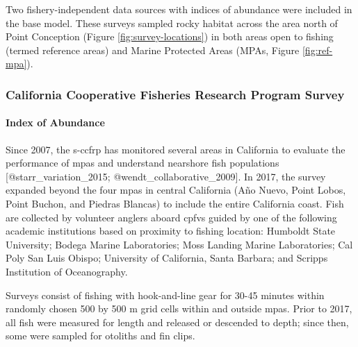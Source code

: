 \documentclass[11pt,
  letterpaper,
]{article}
\begin{document}
Two fishery-independent data sources with indices of abundance were included in the base model. These surveys sampled rocky habitat across the area north of Point Conception (Figure \ref{fig:survey-locations}) in both areas open to fishing (termed reference areas) and Marine Protected Areas (MPAs, Figure \ref{fig:ref-mpa}).

\subsubsection{California Cooperative Fisheries Research Program Survey}\label{california-cooperative-fisheries-research-program-survey}

\paragraph{Index of Abundance}\label{index-of-abundance}

\hfill\break

Since 2007, the \gls{s-ccfrp} has monitored several areas in California to evaluate the performance of \glspl{mpa} and understand nearshore fish populations {[}@starr\_variation\_2015; @wendt\_collaborative\_2009{]}. In 2017, the survey expanded beyond the four \Gls{mpa}s in central California (Año Nuevo, Point Lobos, Point Buchon, and Piedras Blancas) to include the entire California coast. Fish are collected by volunteer anglers aboard \glspl{cpfv} guided by one of the following academic institutions based on proximity to fishing location: Humboldt State University; Bodega Marine Laboratories; Moss Landing Marine Laboratories; Cal Poly San Luis Obispo; University of California, Santa Barbara; and Scripps Institution of Oceanography.

Surveys consist of fishing with hook-and-line gear for 30-45 minutes within randomly chosen 500 by 500 m grid cells within and outside \glspl{mpa}. Prior to 2017, all fish were measured for length and released or descended to depth; since then, some were sampled for otoliths and fin clips.
\end{document}
